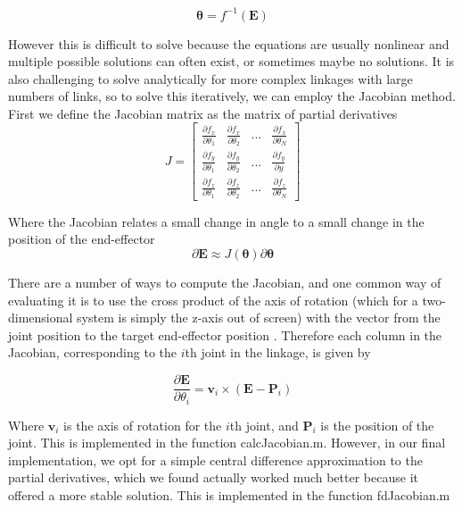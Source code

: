 \documentclass[paper=a4, fontsize=11pt]{scrartcl} %
\numberwithin{equation}{section} %
\numberwithin{figure}{section} %
\numberwithin{table}{section} %
\newcommand{\vect}[1]{\mathbf{#1}}
\newcommand{\params}{\boldsymbol{\theta}}
\newcommand{\dn}[1]{\partial{#1}}
\begin{document}
\begin{equation}
\params = f^{-1}(\vect{E})
\end{equation}

However this is difficult to solve because the equations are usually nonlinear and multiple possible solutions can often exist, or sometimes maybe no solutions. It is also challenging to solve analytically for more complex linkages with large numbers of links, so to solve this iteratively, we can employ the Jacobian method. First we define the Jacobian matrix as the matrix of partial derivatives
\vspace{1mm}
\begin{equation}
J = \left[
\begin{array}{cccc}
\frac{\dn{f_x}}{\dn{\theta_1}} & \frac{\dn{f_x}}{\dn{\theta_2}} & ... & \frac{\dn{f_x}}{\dn{\theta_N}} 
\\[0.2cm]
\frac{\dn{f_y}}{\dn{\theta_1}} & \frac{\dn{f_y}}{\dn{\theta_2}} & ... & \frac{\dn{f_y}}{\dn{y}} 
\\[0.2cm]
\frac{\dn{f_z}}{\dn{\theta_1}} & \frac{\dn{f_z}}{\dn{\theta_2}} & ... & \frac{\dn{f_z}}{\dn{\theta_N}}
\end{array}
\right]
\end{equation}

Where the Jacobian relates a small change in angle to a small change in the position of the end-effector
\vspace{1mm}
\begin{equation}
\partial \vect{E} \approx J(\params) \partial \params
\end{equation}

There are a number of ways to compute the Jacobian, and one common way of evaluating it is to use the cross product of the axis of rotation (which for a two-dimensional system is simply the z-axis out of screen) with the vector from the joint position to the target end-effector position \cite{Buss09}. Therefore each column in the Jacobian, corresponding to the $i$th joint in the linkage, is given by

\begin{equation}
\frac{\dn{\vect{E}}}{\dn{\theta_i}} = \vect{v}_i \times (\vect{E} - \vect{P}_i)
\end{equation}

Where $\vect{v}_i$ is the axis of rotation for the $i$th joint, and $\vect{P}_i$ is the position of the joint. This is implemented in the function calcJacobian.m. However, in our final implementation, we opt for a simple central difference approximation to the partial derivatives, which we found actually worked much better because it offered a more stable solution. This is implemented in the function fdJacobian.m
\end{document}
